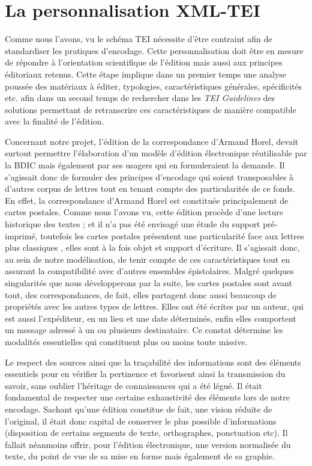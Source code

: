 \documentclass[12pt,a4paper]{book} %
\begin{document}
\chapter{La personnalisation XML-TEI}

Comme nous l'avons, vu le schéma TEI nécessite d'être contraint afin de standardiser les pratiques d'encodage. Cette personnalisation doit être en mesure de répondre à l'orientation scientifique de l'édition mais aussi aux principes éditoriaux retenus. 
Cette étape implique dans un premier temps une analyse poussée des matériaux à éditer, typologies, caractéristiques générales, spécificités etc. afin dans un second temps de rechercher dans les \textit{TEI Guidelines} des solutions permettant de retranscrire ces caractéristiques de manière compatible avec la finalité de l'édition.
\medskip

Concernant notre projet, l'édition de la correspondance d'Armand Horel, devait surtout permettre l'élaboration d'un modèle d'édition électronique réutilisable par la BDIC mais également par ses usagers qui en formuleraient la demande. 
Il s'agissait donc de formuler des principes d'encodage qui soient transposables à d'autres corpus de lettres tout en tenant compte des particularités de ce fonds. En effet, la correspondance d'Armand Horel est constituée principalement de cartes postales. Comme nous l'avons vu, cette édition procède d'une lecture historique des textes ; et il n'a pas été envisagé une étude du support pré-imprimé, toutefois les cartes postales présentent une particularité face aux lettres plus \og classiques \fg{}, elles sont à la fois objet et support d'écriture. Il s'agissait donc, au sein de notre modélisation, de tenir compte de ces caractéristiques tout en assurant la compatibilité avec d'autres ensembles épistolaires. Malgré quelques singularités que nous développerons par la suite, les cartes postales sont avant tout, des correspondances, de fait, elles partagent donc aussi beaucoup de propriétés avec les autres types de lettres. Elles ont été écrites par un auteur, qui est aussi l'expéditeur, en un lieu et une date déterminés, enfin elles comportent un message adressé à un ou plusieurs destinataire. Ce constat détermine les modalités essentielles qui constituent plus ou moins toute missive.

Le respect des sources ainsi que la traçabilité des informations sont des éléments essentiels pour en vérifier la pertinence et favorisent ainsi la transmission du savoir, sans oublier l'héritage de connaissances qui a été légué. Il était fondamental de respecter une certaine exhaustivité des éléments lors de notre encodage. Sachant qu'une édition constitue de fait, une vision réduite de l'original, il était donc capital de conserver le plus possible d'informations   (disposition de certains segments de texte, orthographes, ponctuation etc). Il fallait néanmoins offrir, pour l'édition électronique, une version normalisée du texte, du point de vue de sa mise en forme mais également de sa graphie.
\medskip
\end{document}
